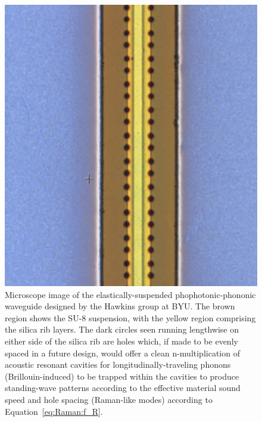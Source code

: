 \begin{figure}[t]
  \centering
  \includegraphics[width=.65\textwidth]{figs/4-Raman/wigglyWaveguideMicroscopeImage.png}
  \caption[Microscope image of the elastically-suspended phophotonic-phononic waveguide.]{Microscope image of the elastically-suspended phophotonic-phononic waveguide designed by the Hawkins group at \ac{BYU}. The brown region shows the SU-8 suspension, with the yellow region comprising the silica rib layers. The dark circles seen running lengthwise on either side of the silica rib are holes which, if made to be evenly spaced in a future design, would offer a clean n-multiplication of acoustic resonant cavities for longitudinally-traveling phonons (Brillouin-induced) to be trapped within the cavities to produce standing-wave patterns according to the effective material sound speed and hole spacing (Raman-like modes) according to Equation~\ref{eq:Raman:f_R}.}
  \label{fig:Raman:wigglyImage}
\end{figure}

